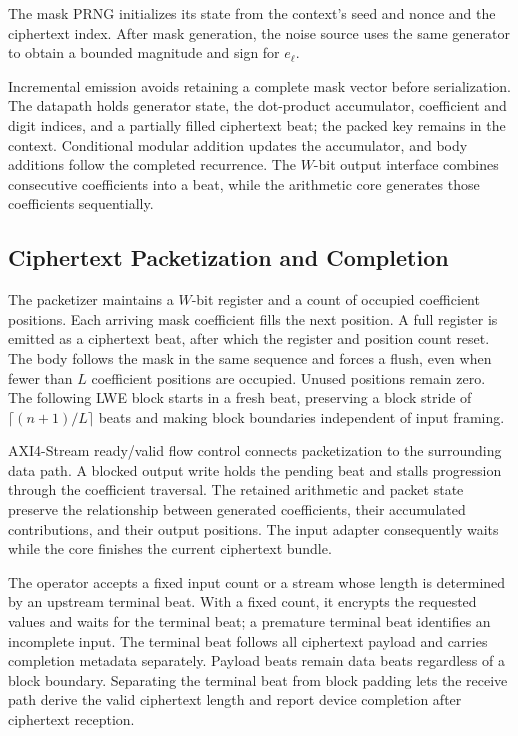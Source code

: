 \documentclass[sigconf,anonymous,balance=false]{acmart}
\newcommand{\bodypar}{\par\vskip 0pt plus 6pt\relax}
\begin{document}
The mask PRNG initializes its state from the context's seed and nonce and the ciphertext index. After mask generation, the noise source uses the same generator to obtain a bounded magnitude and sign for $e_\ell$.
\bodypar

Incremental emission avoids retaining a complete mask vector before serialization. The datapath holds generator state, the dot-product accumulator, coefficient and digit indices, and a partially filled ciphertext beat; the packed key remains in the context. Conditional modular addition updates the accumulator, and body additions follow the completed recurrence. The $W$-bit output interface combines consecutive coefficients into a beat, while the arithmetic core generates those coefficients sequentially.

\subsection{Ciphertext Packetization and Completion}
\label{subsec:tfhe-packetization}

The packetizer maintains a $W$-bit register and a count of occupied coefficient positions. Each arriving mask coefficient fills the next position. A full register is emitted as a ciphertext beat, after which the register and position count reset. The body follows the mask in the same sequence and forces a flush, even when fewer than $L$ coefficient positions are occupied. Unused positions remain zero. The following LWE block starts in a fresh beat, preserving a block stride of $\lceil(n+1)/L\rceil$ beats and making block boundaries independent of input framing.
\bodypar

AXI4-Stream ready/valid flow control connects packetization to the surrounding data path. A blocked output write holds the pending beat and stalls progression through the coefficient traversal. The retained arithmetic and packet state preserve the relationship between generated coefficients, their accumulated contributions, and their output positions. The input adapter consequently waits while the core finishes the current ciphertext bundle.

The operator accepts a fixed input count or a stream whose length is determined by an upstream terminal beat. With a fixed count, it encrypts the requested values and waits for the terminal beat; a premature terminal beat identifies an incomplete input. The terminal beat follows all ciphertext payload and carries completion metadata separately. Payload beats remain data beats regardless of a block boundary. Separating the terminal beat from block padding lets the receive path derive the valid ciphertext length and report device completion after ciphertext reception.
\end{document}
